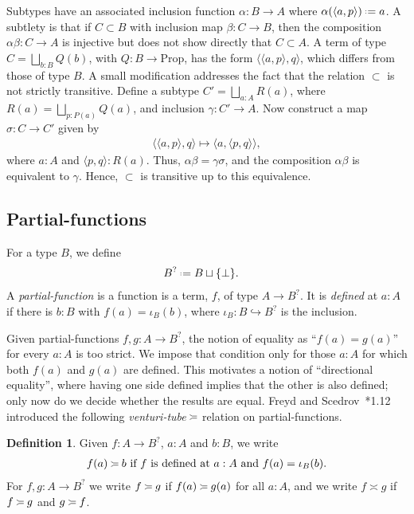 \documentclass{amsart}
\newcommand{\tin}{:}
\numberwithin{lstfloat}{section}
\newcommand{\type}[1]{#1}
\newcommand{\defeq}{\mathrel{\hstretch{.13}{=}\hspace{.2ex}{=}}}
\newcommand{\venturi}{%
  \mathrel{
    \begin{tikzpicture}[yscale=0.6,xscale=0.5]
        \draw (0ex,2.5ex) to (1ex,2ex);
        \draw (1ex,2ex) to (3ex,2ex);
        \draw (0ex,0.75ex) to (1ex,1.25ex);
        \draw (1ex,1.25ex) to (3ex,1.25ex);
    \end{tikzpicture}
  }
}
\theoremstyle{definition}
\newtheorem{defn}[thm]{Definition}
\theoremstyle{remark}
\numberwithin{equation}{section}
\begin{document}
Subtypes have an associated inclusion function 
$\alpha:B\to A$ where $\alpha(\langle
a,p\rangle)\defeq a$. 
A subtlety is that if $C\subset B$ with inclusion map
$\beta:C\to B$, then the composition $\alpha\beta:C\to A$ is injective but does not show directly that $C\subset A$.  A term of type
$C=\bigsqcup_{b:B}Q(b)$, with $Q : B\to \mathrm{Prop}$, has the 
form $\langle \langle a,p\rangle,q\rangle$, which differs from those 
of type $B$.   A small
modification addresses the fact that the relation $\subset$ is not strictly
transitive. Define a subtype $C' = \bigsqcup_{a:A} R(a)$, where
$R(a)=\bigsqcup_{p:P(a)}Q(a)$, and inclusion $\gamma : C' \to A$. 
Now construct a map $\sigma: C\to C'$ given by 
\begin{align*} 
  \langle \langle a,p\rangle,q\rangle \mapsto \langle a,\langle p,q\rangle\rangle,
\end{align*}
where $a:A$ and $\langle p,q\rangle \tin R(a)$. Thus,
$\alpha\beta=\gamma\sigma$, and the composition $\alpha\beta$ is
equivalent to $\gamma$.  Hence, $\subset$ is transitive up to this equivalence. 


\subsection{Partial-functions}\label{sec:partial-functions}
For a type $\type{B}$, we define
\begin{align*} 
  \type{B}^? & \defeq \type{B}\sqcup\{\bot\} .
\end{align*}
A \emph{partial-function} is a function is a term, $f$, of type
$\type{A}\to \type{B}^?$. 
It is \emph{defined} at $a:A$ if there is 
$b:B$ with $f(a)=\iota_B(b)$, where $\iota_B: B\hookrightarrow B^?$ is the
inclusion. 

Given partial-functions $f,g:A\to B^?$, the notion of equality as 
``$f(a)=g(a)$''
for every $a:A$ is too strict.  We impose that condition only 
for those $a:A$ for which both $f(a)$ and $g(a)$ are defined.
This motivates a notion of ``directional equality'', where having one side 
defined implies that the other is also defined; only
now do we decide whether the results are equal. 
Freyd and Scedrov~\cite{FS}*{1.12} introduced the 
following \emph{venturi-tube} $\venturi$ relation 
on partial-functions.

\begin{defn}
  Given $f:A\to B^?$, $a:A$ and $b:B$, we write 
  \begin{align*}
    f(a)\venturi b
    \text{ if }f\text{ is defined at }a:A \text{ and }f(a)=\iota_B(b).
  \end{align*} 
For $f,g:A\to B^?$ we write $f\venturi g$ if $f(a)\venturi g(a)$ for all $a\tin A$, and we write $f\asymp g$ if $f\venturi g$ and $g\venturi f$.
\end{defn}
\end{document}
